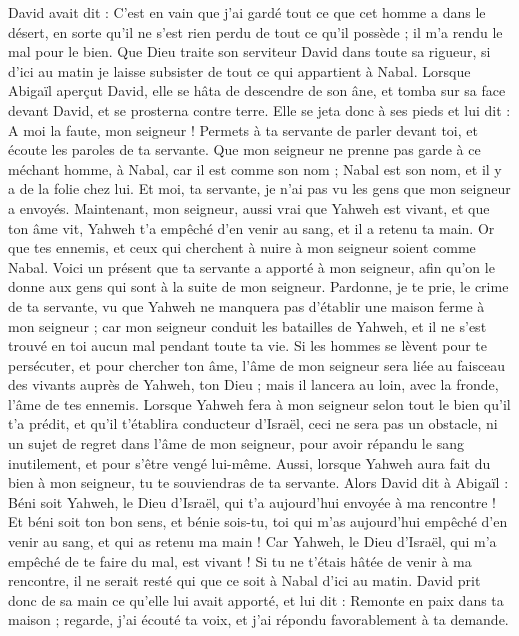 \begin{multicols}{2}
David avait dit : C'est en vain que j'ai gardé tout ce que cet homme a dans le désert, en sorte qu'il ne s'est rien perdu de tout ce qu’il possède ; il m'a rendu le mal pour le bien.
Que Dieu traite son serviteur David dans toute sa rigueur, si d'ici au matin je laisse subsister de tout ce qui appartient à Nabal.
Lorsque Abigaïl aperçut David, elle se hâta de descendre de son âne, et tomba sur sa face devant David, et se prosterna contre terre.
Elle se jeta donc à ses pieds et lui dit : A moi la faute, mon seigneur ! Permets à ta servante de parler devant toi, et écoute les paroles de ta servante.
Que mon seigneur ne prenne pas garde à ce méchant homme, à Nabal, car il est comme son nom ; Nabal est son nom, et il y a de la folie chez lui. Et moi, ta servante, je n'ai pas vu les gens que mon seigneur a envoyés.
Maintenant, mon seigneur, aussi vrai que Yahweh est vivant, et que ton âme vit, Yahweh t'a empêché d'en venir au sang, et il a retenu ta main. Or que tes ennemis, et ceux qui cherchent à nuire à mon seigneur soient comme Nabal.
Voici un présent que ta servante a apporté à mon seigneur, afin qu'on le donne aux gens qui sont à la suite de mon seigneur.
Pardonne, je te prie, le crime de ta servante, vu que Yahweh ne manquera pas d'établir une maison ferme à mon seigneur ; car mon seigneur conduit les batailles de Yahweh, et il ne s'est trouvé en toi aucun mal pendant toute ta vie.
Si les hommes se lèvent pour te persécuter, et pour chercher ton âme, l'âme de mon seigneur sera liée au faisceau des vivants auprès de Yahweh, ton Dieu ; mais il lancera au loin, avec la fronde, l'âme de tes ennemis.
Lorsque Yahweh fera à mon seigneur selon tout le bien qu'il t'a prédit, et qu’il t'établira conducteur d'Israël,
ceci ne sera pas un obstacle, ni un sujet de regret dans l'âme de mon seigneur, pour avoir répandu le sang inutilement, et pour s'être vengé lui-même. Aussi, lorsque Yahweh aura fait du bien à mon seigneur, tu te souviendras de ta servante.
Alors David dit à Abigaïl : Béni soit Yahweh, le Dieu d'Israël, qui t'a aujourd'hui envoyée à ma rencontre !
Et béni soit ton bon sens, et bénie sois-tu, toi qui m'as aujourd'hui empêché d'en venir au sang, et qui as retenu ma main !
Car Yahweh, le Dieu d'Israël, qui m'a empêché de te faire du mal, est vivant ! Si tu ne t’étais hâtée de venir à ma rencontre, il ne serait resté qui que ce soit à Nabal d'ici au matin.
David prit donc de sa main ce qu'elle lui avait apporté, et lui dit : Remonte en paix dans ta maison ; regarde, j'ai écouté ta voix, et j'ai répondu favorablement à ta demande.

\end{multicols}

